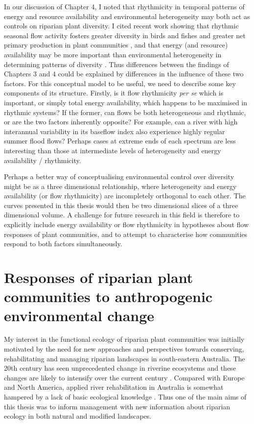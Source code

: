 \documentclass[openright,12pt,a4paper]{memoir}
\begin{document}
{{In our discussion of Chapter 4, I noted that rhythmicity in temporal patterns of energy and resource availability and environmental heterogeneity may both act as controls on riparian plant diversity. I cited recent work showing that rhythmic seasonal flow activity fosters greater diversity in birds and fishes and greater net primary production in plant communities \citep{Jardine2015}, and that energy (and resource) availability may be more important than environmental heterogeneity in determining patterns of diversity \citep{Lundholm2009}. Thus differences between the findings of Chapters 3 and 4 could be explained by differences in the influence of these two factors. For this conceptual model to be useful, we need to describe some key components of its structure. Firstly, is it flow rhythmicity \textit{per se} which is important, or simply total energy availability, which happens to be maximised in rhythmic systems? If the former, can flows be both heterogeneous and rhythmic, or are the two factors inherently opposite? For example, can a river with high interannual variability in its baseflow index also experience highly regular summer flood flows? Perhaps cases at extreme ends of each spectrum are less interesting than those at intermediate levels of heterogeneity and energy availability / rhythmicity.
 
Perhaps a better way of conceptualising environmental control over diversity might be as a three dimensional relationship, where heterogeneity and energy availability (or flow rhythmicity) are incompletely orthogonal to each other. The curves presented in this thesis would then be two dimensional slices of a three dimensional volume. A challenge for future research in this field is therefore to explicitly include energy availability or flow rhythmicity in hypotheses about flow responses of plant communities, and to attempt to characterise how communities respond to both factors simultaneously.

\section{Responses of riparian plant communities to anthropogenic environmental change}
My interest in the functional ecology of riparian plant communities was initially motivated by the need for new approaches and perspectives towards conserving, rehabilitating and managing riparian landscapes in south-eastern Australia. The 20th century has seen unprecedented change in riverine ecosystems and these changes are likely to intensify over the current century \citep{Nilsson2000, Hennessy2008}. Compared with Europe and North America, applied river rehabilitation in Australia is somewhat hampered by a lack of basic ecological knowledge \citep{Brooks2007}. Thus one of the main aims of this thesis was to inform management with new information about riparian ecology in both natural and modified landscapes.

}}
\end{document}
